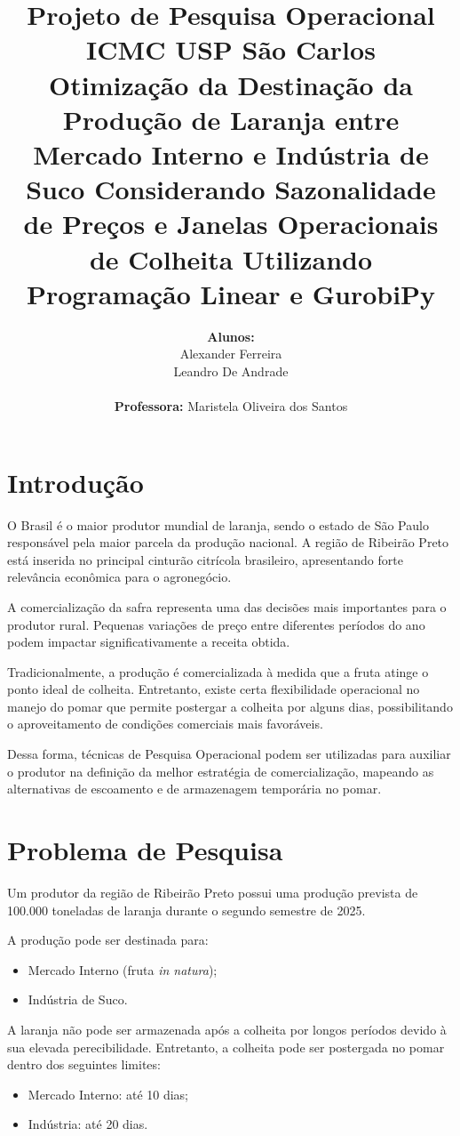 \documentclass[12pt, a4paper]{article}
\title{\textbf{Projeto de Pesquisa Operacional} \\ \vspace{0.2cm} \large{ICMC USP São Carlos} \\ \vspace{0.8cm} \large Otimização da Destinação da Produção de Laranja entre Mercado Interno e Indústria de Suco Considerando Sazonalidade de Preços e Janelas Operacionais de Colheita Utilizando Programação Linear e GurobiPy}
\author{
    \textbf{Alunos:}\\
    Alexander Ferreira\\ 
    Leandro De Andrade \\ 
    \vspace{0.5cm}\\
    \textbf{Professora:} Maristela Oliveira dos Santos
}
\date{}
\begin{document}
\maketitle
\thispagestyle{empty}



\section{Introdução}
O Brasil é o maior produtor mundial de laranja, sendo o estado de São Paulo responsável pela maior parcela da produção nacional. A região de Ribeirão Preto está inserida no principal cinturão citrícola brasileiro, apresentando forte relevância econômica para o agronegócio\cite{ibgelaranja, faesp26}.

A comercialização da safra representa uma das decisões mais importantes para o produtor rural. Pequenas variações de preço entre diferentes períodos do ano podem impactar significativamente a receita obtida.

Tradicionalmente, a produção é comercializada à medida que a fruta atinge o ponto ideal de colheita. Entretanto, existe certa flexibilidade operacional no manejo do pomar que permite postergar a colheita por alguns dias, possibilitando o aproveitamento de condições comerciais mais favoráveis.

Dessa forma, técnicas de Pesquisa Operacional\cite{alPesquisaOperacional2015} podem ser utilizadas para auxiliar o produtor na definição da melhor estratégia de comercialização, mapeando as alternativas de escoamento e de armazenagem temporária no pomar.

\newpage

\section{Problema de Pesquisa}
Um produtor da região de Ribeirão Preto possui uma produção prevista de 100.000 toneladas de laranja durante o segundo semestre de 2025\cite{fundecitrus2026safra}.

A produção pode ser destinada para:
\begin{itemize}
    \item Mercado Interno (fruta \textit{in natura});
    \item Indústria de Suco.
\end{itemize}

A laranja não pode ser armazenada após a colheita por longos períodos devido à sua elevada perecibilidade. Entretanto, a colheita pode ser postergada no pomar dentro dos seguintes limites:
\begin{itemize}
    \item Mercado Interno: até 10 dias;
    \item Indústria: até 20 dias.
\end{itemize}
\end{document}
